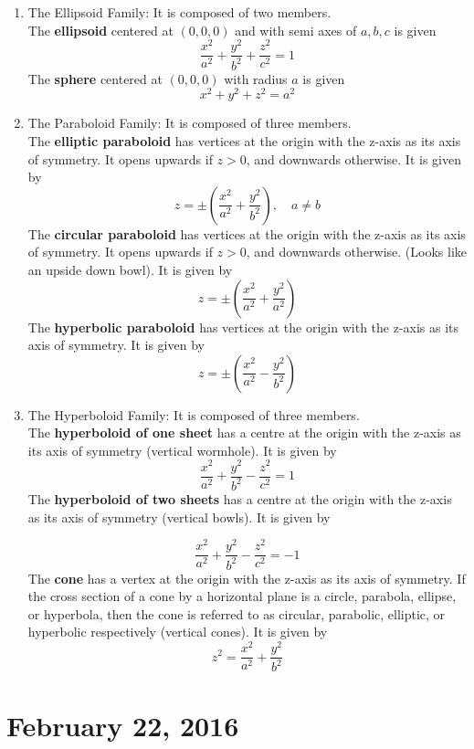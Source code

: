 \documentclass[11pt]{article}
\theoremstyle{plain} %
\theoremstyle{definition}
\theoremstyle{example}
\theoremstyle{remark}
\begin{document}
\begin{enumerate}
	\item The Ellipsoid Family: It is composed of two members. \\The \textbf{ellipsoid} centered at $(0,0,0)$ and with semi axes of $a, b, c$ is given $$\frac{x^2}{a^2}+\frac{y^2}{b^2} + \frac{z^2}{c^2} =1$$ The \textbf{sphere} centered at $(0,0,0)$ with radius $a$ is given 
	$$x^2+y^2+z^2 = a^2$$
	
	\item The Paraboloid Family: It is composed of three members.	\\The \textbf{elliptic paraboloid} has vertices at the origin with the z-axis as its axis of symmetry. It opens upwards if $z>0$, and downwards otherwise. It is given by
	$$z = \pm \left(\frac{x^2}{a^2} + \frac{y^2}{b^2} \right), \quad a\neq b$$
	The \textbf{circular paraboloid} has vertices at the origin with the z-axis as its axis of symmetry. It opens upwards if $z>0$, and downwards otherwise. (Looks like an upside down bowl). It is given by
	$$z = \pm \left( \frac{x^2}{a^2} + \frac{y^2}{a^2} \right)$$
	The \textbf{hyperbolic paraboloid}  has vertices at the origin with the z-axis as its axis of symmetry. It is given by
	$$z = \pm \left(\frac{x^2}{a^2} - \frac{y^2}{b^2} \right)$$

	\item The Hyperboloid Family: It is composed of three members. 
	\\The \textbf{hyperboloid of one sheet} has a centre at the origin with the z-axis as its axis of symmetry (vertical wormhole). It is given by
	$$\frac{x^2}{a^2}+\frac{y^2}{b^2}-\frac{z^2}{c^2} = 1$$
	The \textbf{hyperboloid of two sheets} has a centre at the origin with the z-axis as its axis of symmetry (vertical bowls). It is given by

	$$\frac{x^2}{a^2}+\frac{y^2}{b^2}-\frac{z^2}{c^2} = -1$$
	The \textbf{cone} has a vertex at the origin with the z-axis as its axis of symmetry. If the cross section of a cone by a horizontal plane is a circle, parabola, ellipse, or hyperbola, then the cone is referred to as circular, parabolic, elliptic, or hyperbolic respectively (vertical cones). It is given by
	$$z^2=\frac{x^2}{a^2}+\frac{y^2}{b^2} $$

\end{enumerate}


\section{February 22, 2016}
\end{document}
